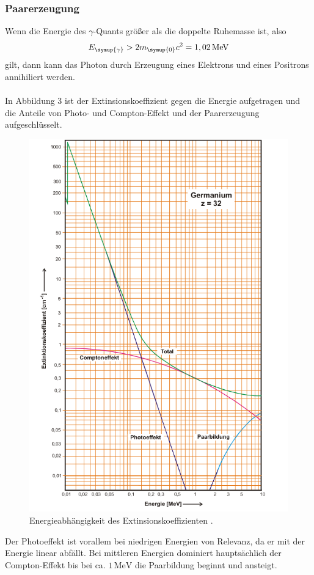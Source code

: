 \subsubsection{Paarerzeugung}
\label{sec:Paarerzeugung}
Wenn die Energie des $\gamma$-Quants größer als die doppelte Ruhemasse ist, also
\begin{align*}
    E_{\symup{\gamma}} > 2m_{\symup{0}}c^2 = 1,02\,\unit{\mega\eV}
\end{align*}
gilt, dann kann das Photon durch Erzeugung eines Elektrons und eines Positrons annihiliert werden.\\
\\
In Abbildung 3 ist der Extinsionskoeffizient gegen die Energie aufgetragen und die Anteile von Photo- und
Compton-Effekt und der Paarerzeugung aufgeschlüsselt.
\begin{figure}
    \centering
    \label{fig:Extinsionskoeffizient}
    \includegraphics[scale=0.75]{Bilder/Energieabhaengigkeit.png}
    \caption{Energieabhängigkeit des Extinsionskoeffizienten \cite{sample}.}
\end{figure}
Der Photoeffekt ist vorallem bei niedrigen Energien von Relevanz, da er mit der Energie linear abfällt.
Bei mittleren Energien dominiert hauptsächlich der Compton-Effekt bis bei ca. $1\,\unit{\mega\eV}$ die
Paarbildung beginnt und ansteigt.

